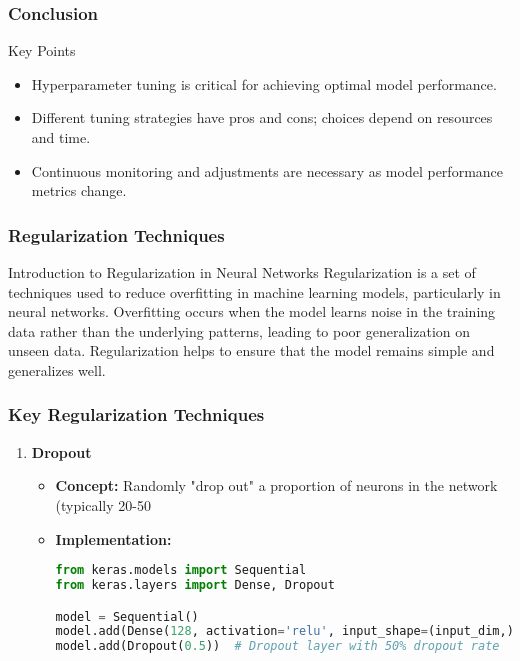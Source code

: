 \documentclass[aspectratio=169]{beamer}
\begin{document}
\begin{frame}
    \frametitle{Conclusion}
    \begin{block}{Key Points}
        \begin{itemize}
            \item Hyperparameter tuning is critical for achieving optimal model performance.
            \item Different tuning strategies have pros and cons; choices depend on resources and time.
            \item Continuous monitoring and adjustments are necessary as model performance metrics change.
        \end{itemize}
    \end{block}
\end{frame}

\begin{frame}
  \frametitle{Regularization Techniques}
  \begin{block}{Introduction to Regularization in Neural Networks}
    Regularization is a set of techniques used to reduce overfitting in machine learning models, particularly in neural networks. 
    Overfitting occurs when the model learns noise in the training data rather than the underlying patterns, leading to poor generalization on unseen data. 
    Regularization helps to ensure that the model remains simple and generalizes well.
  \end{block}
\end{frame}

\begin{frame}
  \frametitle{Key Regularization Techniques}
  \begin{enumerate}
    \item \textbf{Dropout}
      \begin{itemize}
        \item \textbf{Concept:} Randomly "drop out" a proportion of neurons in the network (typically 20-50%
        \item \textbf{Implementation:}
        \begin{lstlisting}[language=python]
from keras.models import Sequential
from keras.layers import Dense, Dropout

model = Sequential()
model.add(Dense(128, activation='relu', input_shape=(input_dim,)))
model.add(Dropout(0.5))  # Dropout layer with 50% dropout rate
        \end{lstlisting}
      \end{itemize}
  \end{enumerate}
\end{frame}
\end{document}
